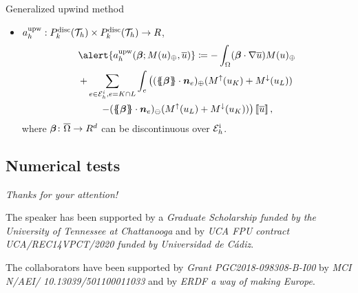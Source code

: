 \begin{frame}{Generalized upwind method}
	\vspace*{-0.1cm}
	\begin{itemize}\itemsep1em
		\item $a_h^{\text{upw}}:\relax{P}^{\text{disc}}_k(\mathcal{T}_h)\times \relax{P}^{\text{disc}}_k(\mathcal{T}_h)\to\relax R$,
		\begin{multline*}
				\alert{\aupw{\bbeta}{M(u)_\oplus}{\bu}}\coloneqq-\int_\Omega (\bbeta\cdot\nabla\overline{u})M(u)_{\oplus}\\+\sum_{e\in\E_h^i,e=K\cap L}\int_e\left((\media{\bbeta}\cdot\nn_e)_{\oplus}(M^\uparrow(\uK)+M^\downarrow(\uL))\right.\\\left.-(\media{\bbeta}\cdot\nn_e)_{\ominus}(M^\uparrow(\uL)+M^\downarrow(\uK))\right)\salto{\bu},
		\end{multline*}
		where $\boldsymbol{\beta}\colon\overline{\Omega}\to\relax R^d$ can be discontinuous over $\mathcal{E}_h^{\text{i}}$.
	\end{itemize}
	
\end{frame}

\subsection{Numerical tests}


\begin{frame}{}
	\centering
	\vspace*{1cm}
	{\Huge
		\emph{Thanks for your attention!}}
	
	\vspace*{1cm}
	\begin{acknowledgements}
		The speaker has been supported by a \textit{Graduate Scholarship funded by the University of Tennessee at Chattanooga} and by \textit{UCA FPU contract UCA/REC14VPCT/2020 funded by Universidad de Cádiz}.
		
		The collaborators have been supported by \textit{Grant PGC2018-098308-B-I00} by \textit{MCI N/AEI/ 10.13039/501100011033} and by \textit{ERDF a way of making Europe}.
	\end{acknowledgements}
\end{frame}